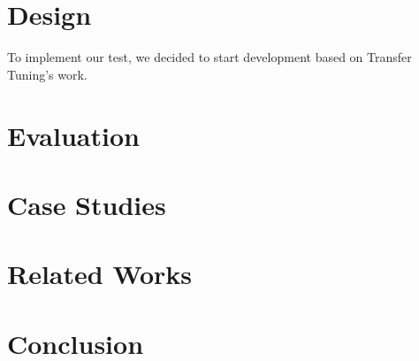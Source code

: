 \documentclass[conference]{IEEEtran}
\begin{document}
\section{Design}
To implement our test, we decided to start development based on Transfer Tuning's work. 

\section{Evaluation}

\section{Case Studies}

\section{Related Works}

\section{Conclusion}






\end{document}
